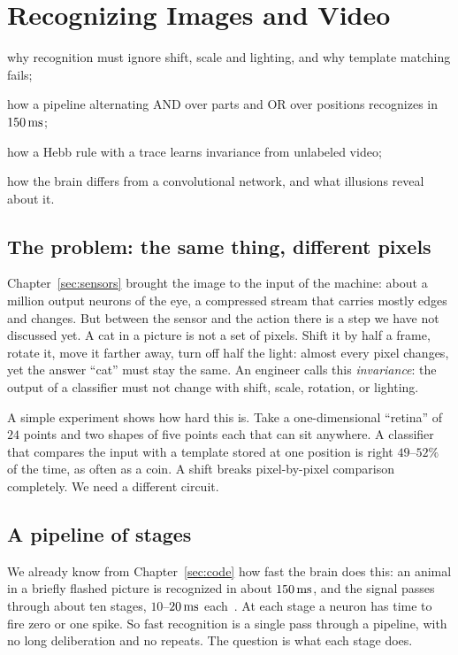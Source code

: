 \chapter{Recognizing Images and Video}
\label{sec:recognition}
\begin{chaptergoals}
\item why recognition must ignore shift, scale and lighting, and why template matching fails;
\item how a pipeline alternating AND over parts and OR over positions recognizes in $150\,\text{ms}$;
\item how a Hebb rule with a trace learns invariance from unlabeled video;
\item how the brain differs from a convolutional network, and what illusions reveal about it.
\end{chaptergoals}

\section{The problem: the same thing, different pixels}

Chapter~\ref{sec:sensors} brought the image to the input of the machine: about a million output neurons of the eye, a compressed stream that carries mostly edges and changes. But between the sensor and the action there is a step we have not discussed yet. A cat in a picture is not a set of pixels. Shift it by half a frame, rotate it, move it farther away, turn off half the light: almost every pixel changes, yet the answer ``cat'' must stay the same. An engineer calls this \emph{invariance}: the output of a classifier must not change with shift, scale, rotation, or lighting.

A simple experiment shows how hard this is. Take a one-dimensional ``retina'' of $24$ points and two shapes of five points each that can sit anywhere. A classifier that compares the input with a template stored at one position is right $49$--$52\%$ of the time, as often as a coin. A shift breaks pixel-by-pixel comparison completely. We need a different circuit.

\section{A pipeline of stages}

We already know from Chapter~\ref{sec:code} how fast the brain does this: an animal in a briefly flashed picture is recognized in about $150\,\text{ms}$, and the signal passes through about ten stages, $10$--$20\,\text{ms}$ each~\cite{Thorpe1996}. At each stage a neuron has time to fire zero or one spike. So fast recognition is a single pass through a pipeline, with no long deliberation and no repeats. The question is what each stage does.

